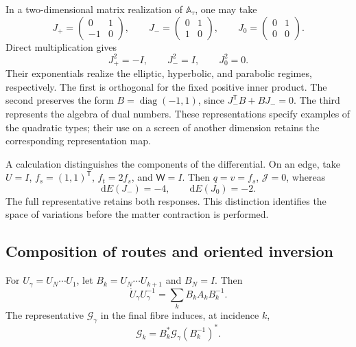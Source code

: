 In a two-dimensional matrix realization of
\(\mathbb A_\tau\), one may take
\[
 J_{+}=\begin{pmatrix}0&1\\-1&0\end{pmatrix},\qquad
 J_{-}=\begin{pmatrix}0&1\\1&0\end{pmatrix},\qquad
 J_{0}=\begin{pmatrix}0&1\\0&0\end{pmatrix}.
\]
Direct multiplication gives
\[
 J_+^2=-I,\qquad J_-^2=I,\qquad J_0^2=0.
\]
Their exponentials realize the elliptic, hyperbolic, and parabolic
regimes, respectively. The first is orthogonal for the fixed positive
inner product. The second preserves the form
\(B=\operatorname{diag}(-1,1)\), since
\(J_-^{\mathsf T}B+BJ_-=0\). The third represents the algebra
of dual numbers. These representations specify examples of the
quadratic types; their use on a screen of another dimension retains
the corresponding representation map.

A calculation distinguishes the components of the differential. On an
edge, take \(U=I\), \(f_s=(1,1)^{\mathsf T}\),
\(f_t=2f_s\), and \(\mathsf W=I\). Then \(q=v=f_s\),
\(\mathcal J=0\), whereas
\begin{equation}
 \mathrm dE(J_-)=-4,\qquad \mathrm dE(J_0)=-2.
 \label{vii:eq:control-regimenes-corriente}
\end{equation}
The full representative retains both responses. This distinction
identifies the space of variations before the matter contraction is
performed.

\subsection{Composition of routes and oriented inversion}

\begin{proposition}
\label{vii:prop:pullback-invertible}
For \(U_\gamma=U_N\cdots U_1\), let
\(B_k=U_N\cdots U_{k+1}\) and \(B_N=I\). Then
\[
 \dot U_\gamma U_\gamma^{-1}
   =\sum_kB_kA_kB_k^{-1}.
\]
The representative \(\mathcal G_\gamma\) in the final fibre induces,
at incidence \(k\),
\begin{equation}
 \mathcal G_k=B_k^*\mathcal G_\gamma(B_k^{-1})^*.
 \label{vii:eq:transporte-contragrediente}
\end{equation}
\end{proposition}

